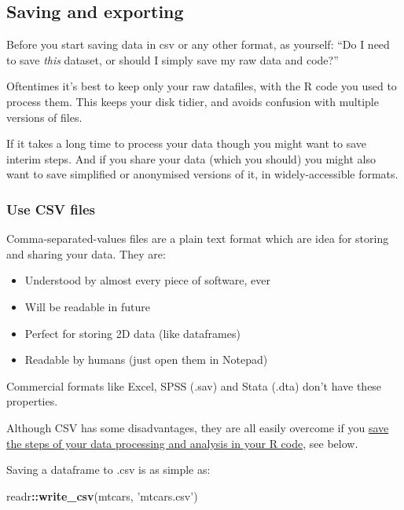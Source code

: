 \documentclass[]{article}
\newenvironment{Shaded}{\begin{snugshade}}{\end{snugshade}}
\newcommand{\KeywordTok}[1]{\textcolor[rgb]{0.13,0.29,0.53}{\textbf{#1}}}
\newcommand{\NormalTok}[1]{#1}
\newcommand{\OperatorTok}[1]{\textcolor[rgb]{0.81,0.36,0.00}{\textbf{#1}}}
\newcommand{\StringTok}[1]{\textcolor[rgb]{0.31,0.60,0.02}{#1}}
\providecommand{\tightlist}{%
  \setlength{\itemsep}{0pt}\setlength{\parskip}{0pt}}
\begin{document}
\hypertarget{saving-and-exporting}{%
\subsection*{Saving and exporting}\label{saving-and-exporting}}

Before you start saving data in csv or any other format, as yourself: ``Do I need
to save \emph{this} dataset, or should I simply save my raw data and code?''

Oftentimes it's best to keep only your raw datafiles, with the R code you used
to process them. This keeps your disk tidier, and avoids confusion with multiple
versions of files.

If it takes a long time to process your data though you might want to save
interim steps. And if you share your data (which you should) you might also want
to save simplified or anonymised versions of it, in widely-accessible formats.

\hypertarget{use-csv}{%
\subsubsection*{Use CSV files}\label{use-csv}}

Comma-separated-values files are a plain text format which are idea for storing
and sharing your data. They are:

\begin{itemize}
\tightlist
\item
  Understood by almost every piece of software, ever
\item
  Will be readable in future
\item
  Perfect for storing 2D data (like dataframes)
\item
  Readable by humans (just open them in Notepad)
\end{itemize}

Commercial formats like Excel, SPSS (.sav) and Stata (.dta) don't have these
properties.

Although CSV has some disadvantages, they are all easily overcome if you
\protect\hyperlink{save-intermediate-steps}{save the steps of your data processing and analysis in your R code},
see below.

Saving a dataframe to .csv is as simple as:

\begin{Shaded}
\begin{Highlighting}[]
\NormalTok{readr}\OperatorTok{::}\KeywordTok{write_csv}\NormalTok{(mtcars, }\StringTok{'mtcars.csv'}\NormalTok{)}
\end{Highlighting}
\end{Shaded}
\end{document}
